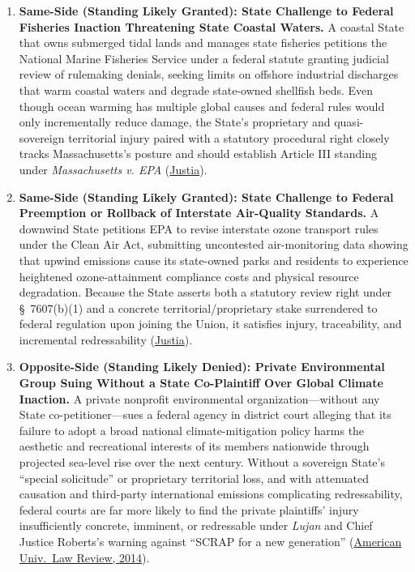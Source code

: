 \documentclass[12pt]{article}
\begin{document}
\begin{enumerate}
    \item \textbf{Same-Side (Standing Likely Granted): State Challenge to Federal Fisheries Inaction Threatening State Coastal Waters.} A coastal State that owns submerged tidal lands and manages state fisheries petitions the National Marine Fisheries Service under a federal statute granting judicial review of rulemaking denials, seeking limits on offshore industrial discharges that warm coastal waters and degrade state-owned shellfish beds. Even though ocean warming has multiple global causes and federal rules would only incrementally reduce damage, the State's proprietary and quasi-sovereign territorial injury paired with a statutory procedural right closely tracks Massachusetts's posture and should establish Article III standing under \textit{Massachusetts v. EPA} (\href{https://supreme.justia.com/cases/federal/us/549/497/}{Justia}).

    \item \textbf{Same-Side (Standing Likely Granted): State Challenge to Federal Preemption or Rollback of Interstate Air-Quality Standards.} A downwind State petitions EPA to revise interstate ozone transport rules under the Clean Air Act, submitting uncontested air-monitoring data showing that upwind emissions cause its state-owned parks and residents to experience heightened ozone-attainment compliance costs and physical resource degradation. Because the State asserts both a statutory review right under \S\ 7607(b)(1) and a concrete territorial/proprietary stake surrendered to federal regulation upon joining the Union, it satisfies injury, traceability, and incremental redressability (\href{https://supreme.justia.com/cases/federal/us/549/497/}{Justia}).

    \item \textbf{Opposite-Side (Standing Likely Denied): Private Environmental Group Suing Without a State Co-Plaintiff Over Global Climate Inaction.} A private nonprofit environmental organization---without any State co-petitioner---sues a federal agency in district court alleging that its failure to adopt a broad national climate-mitigation policy harms the aesthetic and recreational interests of its members nationwide through projected sea-level rise over the next century. Without a sovereign State's ``special solicitude'' or proprietary territorial loss, and with attenuated causation and third-party international emissions complicating redressability, federal courts are far more likely to find the private plaintiffs' injury insufficiently concrete, imminent, or redressable under \textit{Lujan} and Chief Justice Roberts's warning against ``SCRAP for a new generation'' (\href{https://digitalcommons.wcl.american.edu/cgi/viewcontent.cgi?article=1927&context=aulr}{American Univ.\ Law Review, 2014}).


\end{enumerate}
\end{document}
